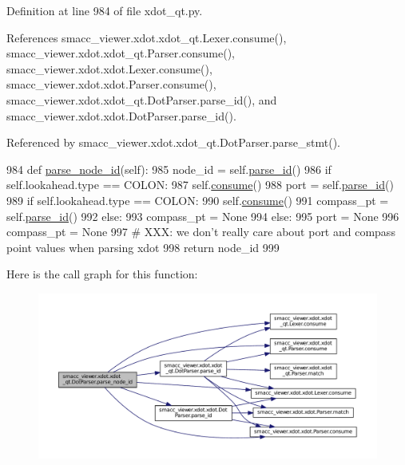 Definition at line 984 of file xdot\+\_\+qt.\+py.



References smacc\+\_\+viewer.\+xdot.\+xdot\+\_\+qt.\+Lexer.\+consume(), smacc\+\_\+viewer.\+xdot.\+xdot\+\_\+qt.\+Parser.\+consume(), smacc\+\_\+viewer.\+xdot.\+xdot.\+Lexer.\+consume(), smacc\+\_\+viewer.\+xdot.\+xdot.\+Parser.\+consume(), smacc\+\_\+viewer.\+xdot.\+xdot\+\_\+qt.\+Dot\+Parser.\+parse\+\_\+id(), and smacc\+\_\+viewer.\+xdot.\+xdot.\+Dot\+Parser.\+parse\+\_\+id().



Referenced by smacc\+\_\+viewer.\+xdot.\+xdot\+\_\+qt.\+Dot\+Parser.\+parse\+\_\+stmt().


\begin{DoxyCode}
984     \textcolor{keyword}{def }\hyperlink{classsmacc__viewer_1_1xdot_1_1xdot__qt_1_1DotParser_ace388b95579ee0b4b3ffb47449316912}{parse\_node\_id}(self):
985         node\_id = self.\hyperlink{classsmacc__viewer_1_1xdot_1_1xdot__qt_1_1DotParser_a7ed529e7510bac45a0df282195f3dfea}{parse\_id}()
986         \textcolor{keywordflow}{if} self.lookahead.type == COLON:
987             self.\hyperlink{classsmacc__viewer_1_1xdot_1_1xdot__qt_1_1Parser_aba6f69f48f1d4e25b13e4cb297f509e6}{consume}()
988             port = self.\hyperlink{classsmacc__viewer_1_1xdot_1_1xdot__qt_1_1DotParser_a7ed529e7510bac45a0df282195f3dfea}{parse\_id}()
989             \textcolor{keywordflow}{if} self.lookahead.type == COLON:
990                 self.\hyperlink{classsmacc__viewer_1_1xdot_1_1xdot__qt_1_1Parser_aba6f69f48f1d4e25b13e4cb297f509e6}{consume}()
991                 compass\_pt = self.\hyperlink{classsmacc__viewer_1_1xdot_1_1xdot__qt_1_1DotParser_a7ed529e7510bac45a0df282195f3dfea}{parse\_id}()
992             \textcolor{keywordflow}{else}:
993                 compass\_pt = \textcolor{keywordtype}{None}
994         \textcolor{keywordflow}{else}:
995             port = \textcolor{keywordtype}{None}
996             compass\_pt = \textcolor{keywordtype}{None}
997         \textcolor{comment}{# XXX: we don't really care about port and compass point values when parsing xdot}
998         \textcolor{keywordflow}{return} node\_id
999 
\end{DoxyCode}


Here is the call graph for this function\+:
\nopagebreak
\begin{figure}[H]
\begin{center}
\leavevmode
\includegraphics[width=350pt]{classsmacc__viewer_1_1xdot_1_1xdot__qt_1_1DotParser_ace388b95579ee0b4b3ffb47449316912_cgraph}
\end{center}
\end{figure}




